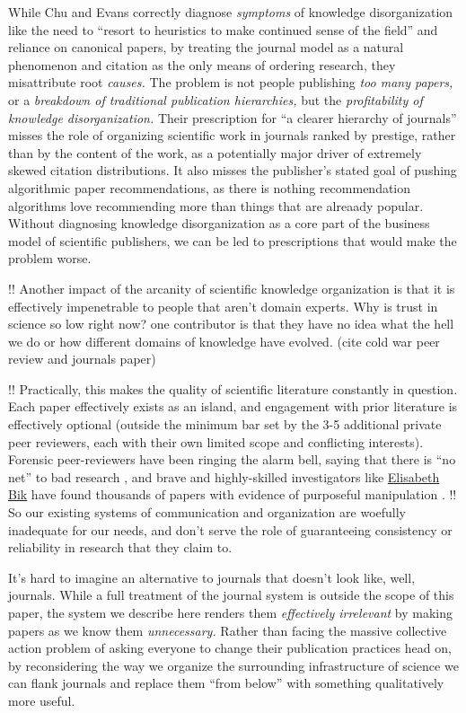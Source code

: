 \documentclass[notoc]{tufte-book}
\begin{document}
While Chu and Evans correctly diagnose \emph{symptoms} of knowledge
disorganization like the need to ``resort to heuristics to make
continued sense of the field'' and reliance on canonical papers, by
treating the journal model as a natural phenomenon and citation as the
only means of ordering research, they misattribute root \emph{causes.}
The problem is not people publishing \emph{too many papers,} or a
\emph{breakdown of traditional publication hierarchies,} but the
\emph{profitability of knowledge disorganization.} Their prescription
for ``a clearer hierarchy of journals'' misses the role of organizing
scientific work in journals ranked by prestige, rather than by the
content of the work, as a potentially major driver of extremely skewed
citation distributions. It also misses the publisher's stated goal of
pushing algorithmic paper recommendations, as there is nothing
recommendation algorithms love recommending more than things that are
alreaady popular. Without diagnosing knowledge disorganization as a core
part of the business model of scientific publishers, we can be led to
prescriptions that would make the problem worse.

!! Another impact of the arcanity of scientific knowledge organization
is that it is effectively impenetrable to people that aren't domain
experts. Why is trust in science so low right now? one contributor is
that they have no idea what the hell we do or how different domains of
knowledge have evolved. (cite cold war peer review and journals paper)

!! Practically, this makes the quality of scientific literature
constantly in question. Each paper effectively exists as an island, and
engagement with prior literature is effectively optional (outside the
minimum bar set by the 3-5 additional private peer reviewers, each with
their own limited scope and conflicting interests). Forensic
peer-reviewers have been ringing the alarm bell, saying that there is
``no net'' to bad research \citep{heathersRealScandalIvermectin2021} , and brave and highly-skilled investigators like
\href{https://scienceintegritydigest.com/}{Elisabeth Bik} have found
thousands of papers with evidence of purposeful manipulation \citep{shenMeetThisSuperspotter2020, bikPrevalenceInappropriateImage2016} .
!! So our existing systems of communication and organization are
woefully inadequate for our needs, and don't serve the role of
guaranteeing consistency or reliability in research that they claim to.

It's hard to imagine an alternative to journals that doesn't look like,
well, journals. While a full treatment of the journal system is outside
the scope of this paper, the system we describe here renders them
\emph{effectively irrelevant} by making papers as we know them
\emph{unnecessary.} Rather than facing the massive collective action
problem of asking everyone to change their publication practices head
on, by reconsidering the way we organize the surrounding infrastructure
of science we can flank journals and replace them ``from below'' with
something qualitatively more useful.
\end{document}
